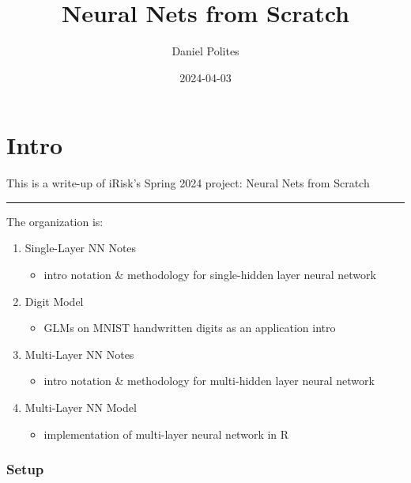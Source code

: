 \documentclass[
]{book}
\title{Neural Nets from Scratch}
\author{Daniel Polites}
\date{2024-04-03}
\providecommand{\tightlist}{%
  \setlength{\itemsep}{0pt}\setlength{\parskip}{0pt}}
\begin{document}
\maketitle

{
\setcounter{tocdepth}{1}
\tableofcontents
}
\hypertarget{intro}{%
\chapter{Intro}\label{intro}}

This is a write-up of iRisk's Spring 2024 project: Neural Nets from Scratch

\begin{center}\rule{0.5\linewidth}{0.5pt}\end{center}

The organization is:

\begin{enumerate}
\def\labelenumi{\arabic{enumi}.}
\setcounter{enumi}{1}
\tightlist
\item
  Single-Layer NN Notes

  \begin{itemize}
  \tightlist
  \item
    intro notation \& methodology for single-hidden layer neural network
  \end{itemize}
\item
  Digit Model

  \begin{itemize}
  \tightlist
  \item
    GLMs on MNIST handwritten digits as an application intro
  \end{itemize}
\item
  Multi-Layer NN Notes

  \begin{itemize}
  \tightlist
  \item
    intro notation \& methodology for multi-hidden layer neural network
  \end{itemize}
\item
  Multi-Layer NN Model

  \begin{itemize}
  \tightlist
  \item
    implementation of multi-layer neural network in R
  \end{itemize}
\end{enumerate}

\hypertarget{setup}{%
\subsection{Setup}\label{setup}}
\end{document}

